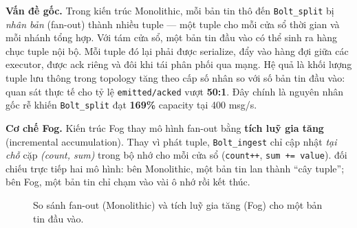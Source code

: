 \documentclass[13pt,a4paper]{report}
\newcommand{\code}[1]{\texttt{\small #1}}
\begin{document}
\textbf{Vấn đề gốc.} Trong kiến trúc Monolithic, mỗi bản tin thô đến
\code{Bolt\_split} bị \textit{nhân bản} (fan-out) thành nhiều tuple --- một tuple
cho mỗi cửa sổ thời gian và mỗi nhánh tổng hợp. Với tám cửa sổ, một bản tin đầu
vào có thể sinh ra hàng chục tuple nội bộ. Mỗi tuple đó lại phải được serialize,
đẩy vào hàng đợi giữa các executor, được ack riêng và đôi khi tái phân phối qua
mạng. Hệ quả là khối lượng tuple lưu thông trong topology tăng theo cấp số nhân so
với số bản tin đầu vào: quan sát thực tế cho tỷ lệ \code{emitted/acked} vượt
\textbf{50:1}. Đây chính là nguyên nhân gốc rễ khiến \code{Bolt\_split} đạt
\textbf{169\%} capacity tại 400 msg/s.

\textbf{Cơ chế Fog.} Kiến trúc Fog thay mô hình fan-out bằng \textbf{tích luỹ gia
tăng} (incremental accumulation). Thay vì phát tuple, \code{Bolt\_ingest} chỉ cập
nhật \textit{tại chỗ} cặp \textit{(count, sum)} trong bộ nhớ cho mỗi cửa sổ
(\code{count++}, \code{sum += value}).  đối chiếu trực tiếp
hai mô hình: bên Monolithic, một bản tin lan thành ``cây tuple''; bên Fog, một bản
tin chỉ chạm vào vài ô nhớ rồi kết thúc.

\begin{figure}[H]
\centering
{}
\caption{So sánh fan-out (Monolithic) và tích luỹ gia tăng (Fog) cho một bản tin đầu vào.}
\label{fig:imp-fanout}
\end{figure}
\end{document}
